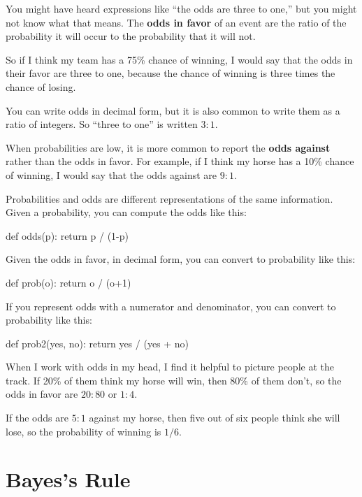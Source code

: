 \documentclass[12pt]{book}
\theoremstyle{exercise}
\begin{document}

You might have heard expressions like ``the odds are
three to one,'' but you might not know what that means.  
The {\bf odds in favor} of an event are the ratio of the probability
it will occur to the probability that it will not.

So if I think my team has a 75\% chance of winning, I would
say that the odds in their favor are three to one, because
the chance of winning is three times the chance of losing.

You can write odds in decimal form, but it is also common to
write them as a ratio of integers.  So ``three to one'' is
written $3:1$.

When probabilities are low, it is more common to report the
{\bf odds against} rather than the odds in favor.  For
example, if I think my horse has a 10\% chance of winning,
I would say that the odds against are $9:1$.

Probabilities and odds are different representations of the
same information.  Given a probability, you can compute the
odds like this:

\begin{code}
def odds(p):
    return p / (1-p)
\end{code}

Given the odds in favor, in decimal form, you can convert to
probability like this:

\begin{code}
def prob(o):
    return o / (o+1)
\end{code}

If you represent odds with a numerator and denominator, you
can convert to probability like this:

\begin{code}
def prob2(yes, no):
    return yes / (yes + no)
\end{code}

When I work with odds in my head, I find it helpful to picture
people at the track.  If 20\% of them think my horse will win,
then 80\% of them don't, so the odds in favor are $20:80$ or
$1:4$.

If the odds are $5:1$ against my horse, then five out of six
people think she will lose, so the probability of winning
is $1/6$.



\section{Bayes's Rule}
\end{document}
